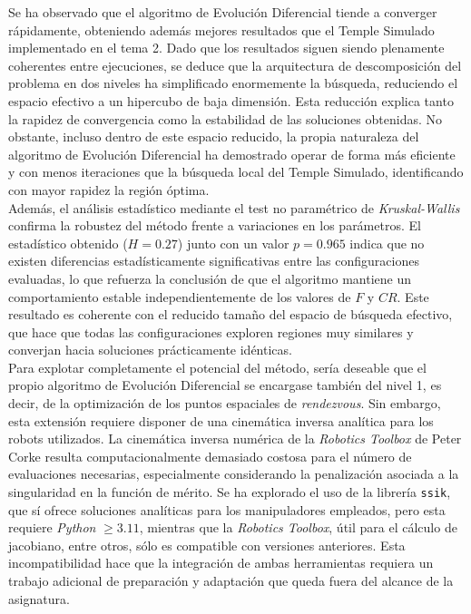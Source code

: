 Se ha observado que el algoritmo de Evolución Diferencial tiende a converger rápidamente, 
obteniendo además mejores resultados que el Temple Simulado implementado en el tema 2. 
Dado que los resultados siguen siendo plenamente coherentes entre ejecuciones, se deduce que 
la arquitectura de descomposición del problema en dos niveles ha simplificado enormemente la 
búsqueda, reduciendo el espacio efectivo a un hipercubo de baja dimensión. Esta reducción 
explica tanto la rapidez de convergencia como la estabilidad de las soluciones obtenidas. 
No obstante, incluso dentro de este espacio reducido, la propia naturaleza del algoritmo de 
Evolución Diferencial ha demostrado operar de forma más eficiente y con menos iteraciones que 
la búsqueda local del Temple Simulado, identificando con mayor rapidez la región óptima. \\

Además, el análisis estadístico mediante el test no paramétrico de \textit{Kruskal-Wallis} confirma 
la robustez del método frente a variaciones en los parámetros. El estadístico obtenido 
($H = 0.27$) junto con un valor $p = 0.965$ indica que no existen diferencias estadísticamente 
significativas entre las configuraciones evaluadas, lo que refuerza la conclusión de que el 
algoritmo mantiene un comportamiento estable independientemente de los valores de $F$ y $CR$. 
Este resultado es coherente con el reducido tamaño del espacio de búsqueda efectivo, que hace 
que todas las configuraciones exploren regiones muy similares y converjan hacia soluciones 
prácticamente idénticas. \\

Para explotar completamente el potencial del método, sería deseable que el propio algoritmo 
de Evolución Diferencial se encargase también del nivel 1, es decir, de la optimización de los 
puntos espaciales de \textit{rendezvous}. Sin embargo, esta extensión requiere disponer de una 
cinemática inversa analítica para los robots utilizados. La cinemática inversa numérica de la 
\textit{Robotics Toolbox} de Peter Corke resulta computacionalmente demasiado costosa para el 
número de evaluaciones necesarias, especialmente considerando la penalización asociada a la 
singularidad en la función de mérito. Se ha explorado el uso de la librería \texttt{ssik}, que sí ofrece 
soluciones analíticas para los manipuladores empleados, pero esta requiere \textit{Python} $\geq 3.11$, 
mientras que la \textit{Robotics Toolbox}, útil para el cálculo de jacobiano,
entre otros, sólo es compatible con versiones anteriores. Esta 
incompatibilidad hace que la integración de ambas herramientas requiera un trabajo adicional de 
preparación y adaptación que queda fuera del alcance de la asignatura. \\

